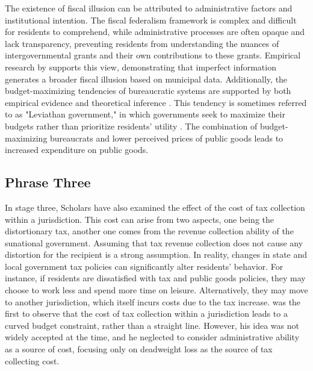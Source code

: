 The existence of fiscal illusion can be attributed to administrative factors and institutional intention. The fiscal federalism framework is complex and difficult for residents to comprehend, while administrative processes are often opaque and lack transparency, preventing residents from understanding the nuances of intergovernmental grants and their own contributions to these grants. Empirical research by \textcite{turnbull1998overspending} supports this view, demonstrating that imperfect information generates a broader fiscal illusion based on municipal data. Additionally, the budget-maximizing tendencies of bureaucratic systems are supported by both empirical evidence and theoretical inference \parencite{mueller2003public,brennan1977towards}. This tendency is sometimes referred to as "Leviathan government," in which governments seek to maximize their budgets rather than prioritize residents' utility \parencite{quigley1986budget}. The combination of budget-maximizing bureaucrats and lower perceived prices of public goods leads to increased expenditure on public goods.


\subsection{Phrase Three}

In stage three, Scholars have also examined the effect of the cost of tax collection within a jurisdiction. This cost can arise from two aspects, one being the distortionary tax, another one comes from the revenue collection ability of the sunational government. Assuming that tax revenue collection does not cause any distortion for the recipient is a strong assumption. In reality, changes in state and local government tax policies can significantly alter residents' behavior. For instance, if residents are dissatisfied with tax and public goods policies, they may choose to work less and spend more time on leisure. Alternatively, they may move to another jurisdiction, which itself incurs costs due to the tax increase. \textcite{hamilton1986flypaper} was the first to observe that the cost of tax collection within a jurisdiction leads to a curved budget constraint, rather than a straight line. However, his idea was not widely accepted at the time, and he neglected to consider administrative ability as a source of cost, focusing only on deadweight loss as the source of tax collecting cost.


